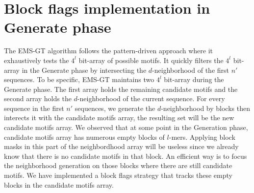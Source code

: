 \section{Block flags implementation in Generate phase}

The EMS-GT algorithm follows the pattern-driven approach where it exhaustively tests the $4^l$ bit-array of possible motifs. It quickly filters the $4^l$ bit-array in the Generate phase by intersecting the $d$-neighborhood of the first $n'$ sequences. To be specific, EMS-GT maintains two $4^l$ bit-array during the Generate phase. The first array holds the remaining candidate motifs and the second array holds the $d$-neighborhood of the current sequence. For every sequence in the first $n'$ sequences, we generate the $d$-neighborhood by blocks then interects it with the candidate motifs array, the resulting set will be the new candidate motifs array. We observed that at some point in the Generation phase, candidate motifs array has numerous empty blocks of $l$-mers. Applying block masks in this part of the neighbordhood array will be useless since we already know that there is no candidate motifs in that block. An efficient way is to focus the neighborhood generation on those blocks where there are still candidate motifs. We have implemented a block flags strategy that tracks these empty blocks in the candidate motifs array.

